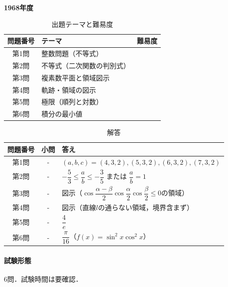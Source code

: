 \documentclass[../../main.tex]{subfiles}
\begin{document}
\begin{center}
  {\fontsize{48pt}{58pt}\selectfont \textbf{1968}\normalsize\textbf{年度}}
\end{center}

\begin{table}[htb]
  \centering
  \caption{出題テーマと難易度}
  \begin{tabular}{|c|p{9cm}|c|}
    \hline
    \textbf{問題番号} & \textbf{テーマ} & \textbf{難易度} \\
    \hline
    第1問 & 整数問題（不等式） & \\
    \hline
    第2問 & 不等式（二次関数の判別式） & \\
    \hline
    第3問 & 複素数平面と領域図示 & \\
    \hline
    第4問 & 軌跡・領域の図示 & \\
    \hline
    第5問 & 極限（順列と対数） & \\
    \hline
    第6問 & 積分の最小値 & \\
    \hline
  \end{tabular}
\end{table}

\begin{table}[htb]
  \centering
  \caption{解答}
  \renewcommand{\arraystretch}{1.4}
  \begin{tabular}{|c|c|p{9cm}|}
    \hline
    \textbf{問題番号} & \textbf{小問} & \textbf{答え} \\
    \hline
    第1問 & - & $(a,b,c)=(4,3,2),(5,3,2),(6,3,2),(7,3,2)$ \\
    \hline
    第2問 & - & $-\dfrac{5}{3}\le\dfrac{a}{b}\le-\dfrac{3}{5}$ または $\dfrac{a}{b}=1$ \\
    \hline
    第3問 & - & 図示（$\cos\dfrac{\alpha-\beta}{2}\cos\dfrac{\alpha}{2}\cos\dfrac{\beta}{2}\le0$の領域） \\
    \hline
    第4問 & - & 図示（直線$l$の通らない領域，境界含まず） \\
    \hline
    第5問 & - & $\dfrac{4}{e}$ \\
    \hline
    第6問 & - & $\dfrac{\pi}{16}$（$f(x)=\sin^2x\cos^2x$） \\
    \hline
  \end{tabular}
\end{table}

\paragraph{試験形態}
6問．試験時間は要確認．
\end{document}
